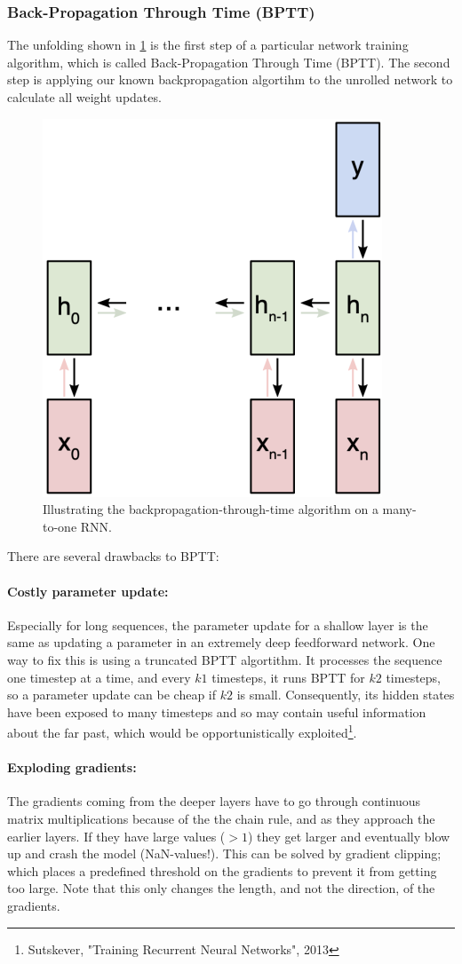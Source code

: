 \documentclass[main]{subfiles}
\begin{document}
\subsubsection{Back-Propagation Through Time (BPTT)}
The unfolding shown in \cref{fig:unroll} is the first step of a particular network training algorithm, which is called Back-Propagation Through Time (BPTT). The second step is applying our known backpropagation algortihm to the unrolled network to calculate all weight updates. 
%
\begin{figure}[H]
    \centering
    \includegraphics[width=0.5\linewidth]{13_LearningInRecurrentNeuronalNetworks/figures/bptt.png}
    \caption{Illustrating the backpropagation-through-time algorithm on a many-to-one RNN.}
    \label{fig:unroll}
\end{figure}
%
There are several drawbacks to BPTT:
\paragraph{Costly parameter update:} Especially for long sequences, the parameter update for a shallow layer is the same as updating a parameter in an extremely deep feedforward network. One way to fix this is using a truncated BPTT algortithm.  It processes the sequence one timestep at a time, and every $k1$ timesteps, it runs BPTT for $k2$ timesteps, so a parameter update can be cheap if $k2$ is small. Consequently, its hidden states have been exposed to many timesteps and so may contain useful information about the far past, which would be opportunistically exploited\footnote{Sutskever, "Training Recurrent Neural Networks", 2013}.

\paragraph{Exploding gradients:} The gradients coming from the deeper layers have to go through continuous matrix multiplications because of the the chain rule, and as they approach the earlier layers. If they have large values ($>1$) they get larger and eventually blow up and crash the model (NaN-values!). This can be solved by gradient clipping; which places a predefined threshold on the gradients to prevent it from getting too large. Note that this only changes the length, and not the direction, of the gradients.
\end{document}
